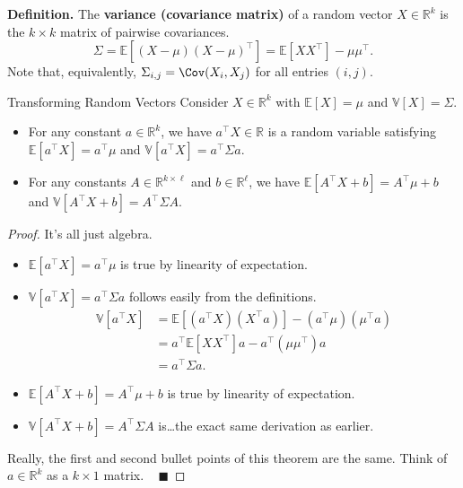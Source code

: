 \textbf{Definition.} The \textbf{variance (covariance matrix)}
of a random vector $X \in \mathbb{R}^k$ is the $k \times k$ matrix of pairwise covariances.
\[ \Sigma = \mathbb{E}[(X - \mu)(X - \mu)^{\top}] = \mathbb{E}[XX^{\top}] - \mu\mu^{\top}. \]
Note that, equivalently, $\Sigma_{i, j} = \Cov(X_i, X_j)$ for all entries $(i, j)$.

\begin{theorem}{Transforming Random Vectors}
    Consider $X \in \mathbb{R}^k$ with $\mathbb{E}[X] = \mu$ and $\mathbb{V}[X] = \Sigma$.
    \begin{itemize}
        \item For any constant $a \in \mathbb{R}^k$, we have $a^{\top}X \in \mathbb{R}$ 
        is a random variable satisfying $\mathbb{E}[a^{\top}X] = a^{\top}\mu$
        and $\mathbb{V}[a^{\top}X] = a^{\top}\Sigma a$.
        \item For any constants $A \in \mathbb{R}^{k \times \ell}$ and $b \in \mathbb{R}^{\ell}$,
        we have $\mathbb{E}[A^{\top}X + b] = A^{\top}\mu + b$ and
        $\mathbb{V}[A^{\top}X + b] = A^{\top}\Sigma A$.
    \end{itemize}
\end{theorem}

\begin{proof}
    It's all just algebra.
    \begin{itemize}
        \item $\mathbb{E}[a^{\top}X] = a^{\top}\mu$ is true by linearity of expectation.
        \item $\mathbb{V}[a^{\top}X] = a^{\top}\Sigma a$ follows easily from the definitions.
        \begin{align*}
            \mathbb{V}[a^{\top}X] & = \mathbb{E}[(a^{\top}X)(X^{\top}a)] -
            (a^{\top}\mu)(\mu^{\top}a) \\
            & = a^{\top}\mathbb{E}[XX^{\top}]a - a^{\top}(\mu\mu^{\top})a \\
            & = a^{\top}\Sigma a.
        \end{align*}  
        \item $\mathbb{E}[A^{\top}X + b] = A^{\top}\mu + b$ is true by linearity of expectation.
        \item $\mathbb{V}[A^{\top}X + b] = A^{\top}\Sigma A$ is\dots the exact same derivation as earlier.
    \end{itemize}
    Really, the first and second bullet points of this theorem are the same.
    Think of $a \in \mathbb{R}^k$ as a $k \times 1$ matrix. ~ $\blacksquare$
\end{proof}

